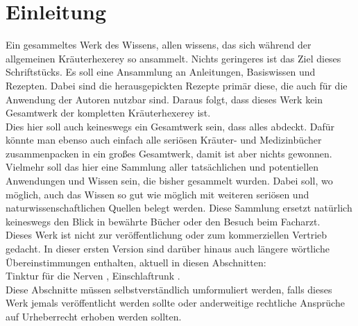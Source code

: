 
\chapter{Einleitung}
\label{   }



Ein gesammeltes Werk des Wissens, allen wissens, das sich während der allgemeinen Kräuterhexerey so ansammelt. Nichts geringeres ist das Ziel dieses Schriftstücks. Es soll eine Ansammlung an Anleitungen, Basiswissen und Rezepten. Dabei sind die herausgepickten Rezepte primär diese, die auch für die Anwendung der Autoren nutzbar sind. Daraus folgt, dass dieses Werk kein Gesamtwerk der kompletten Kräuterhexerey ist.\\

Dies hier soll auch keineswegs ein Gesamtwerk sein, dass alles abdeckt. Dafür könnte man ebenso auch einfach alle seriösen Kräuter- und Medizinbücher zusammenpacken in ein großes Gesamtwerk, damit ist aber nichts gewonnen. Vielmehr soll das hier eine Sammlung aller tatsächlichen und potentiellen Anwendungen und Wissen sein, die bisher gesammelt wurden. Dabei soll, wo möglich, auch das Wissen so gut wie möglich mit weiteren seriösen und naturwissenschaftlichen Quellen belegt werden. Diese Sammlung ersetzt natürlich keineswegs den Blick in bewährte Bücher oder den Besuch beim Facharzt.\\

Dieses Werk ist nicht zur veröffentlichung oder zum kommerziellen Vertrieb gedacht. In dieser ersten Version sind darüber hinaus auch längere wörtliche Übereinstimmungen enthalten, aktuell in diesen Abschnitten: \\ Tinktur für die Nerven \cite{nedoma2018heiltinkturen}, Einschlaftrunk \cite{nedoma2018heiltinkturen}.\\ Diese Abschnitte müssen selbstverständlich umformuliert werden, falls dieses Werk jemals veröffentlicht werden sollte oder anderweitige rechtliche Ansprüche auf Urheberrecht erhoben werden sollten.
